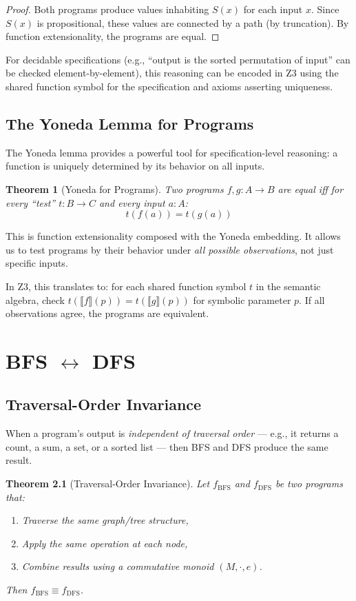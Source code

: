 \documentclass[11pt,a4paper]{report}
\theoremstyle{definition}
\theoremstyle{plain}
\newtheorem{theorem}[definition]{Theorem}
\newcommand{\den}[1]{\llbracket #1 \rrbracket}     %
\begin{document}
\begin{proof}
Both programs produce values inhabiting $S(x)$ for each input $x$.
Since $S(x)$ is propositional, these values are connected by a path
(by truncation).  By function extensionality, the programs are equal.
\end{proof}

For decidable specifications (e.g., ``output is the sorted permutation
of input'' can be checked element-by-element), this reasoning can be
encoded in Z3 using the shared function symbol for the specification
and axioms asserting uniqueness.

\section{The Yoneda Lemma for Programs}

The Yoneda lemma provides a powerful tool for specification-level
reasoning: a function is uniquely determined by its behavior on all
inputs.

\begin{theorem}[Yoneda for Programs]
Two programs $f, g : A \to B$ are equal iff for every ``test''
$t : B \to C$ and every input $a : A$:
\[
  t(f(a)) = t(g(a))
\]
\end{theorem}

This is function extensionality composed with the Yoneda embedding.
It allows us to test programs by their behavior under \emph{all
possible observations}, not just specific inputs.

In Z3, this translates to: for each shared function symbol $t$ in the
semantic algebra, check $t(\den{f}(p)) = t(\den{g}(p))$ for symbolic
parameter $p$.  If all observations agree, the programs are equivalent.


\chapter{BFS $\leftrightarrow$ DFS}
\label{ch:bfs-dfs}

\section{Traversal-Order Invariance}

When a program's output is \emph{independent of traversal order} ---
e.g., it returns a count, a sum, a set, or a sorted list --- then
BFS and DFS produce the same result.

\begin{theorem}[Traversal-Order Invariance]
\label{thm:traversal}
Let $f_{\mathrm{BFS}}$ and $f_{\mathrm{DFS}}$ be two programs that:
\begin{enumerate}
  \item Traverse the same graph/tree structure,
  \item Apply the same operation at each node,
  \item Combine results using a \emph{commutative monoid} $(M, \cdot, e)$.
\end{enumerate}
Then $f_{\mathrm{BFS}} \equiv f_{\mathrm{DFS}}$.
\end{theorem}
\end{document}
